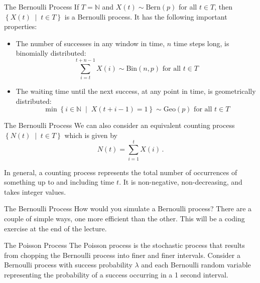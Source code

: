 \documentclass[10pt]{beamer}
\begin{document}
\begin{frame}[fragile]{The Bernoulli Process}
If \(T = \mathbb{N}\) and \(X\left(t\right) \sim \textrm{Bern}\left(p\right)\) for all \(t \in T\), then \(\left\{X\left(t\right) \;\middle|\; t \in T\right\}\) is a Bernoulli process. It has the following important properties:
\begin{itemize}[<+->]
    \item The number of successes in any window in time, \(n\) time steps long, is binomially distributed:
    \begin{equation*}
        \sum_{i = t}^{t + n - 1} X\left(i\right) \sim \textrm{Bin}\left(n, p\right) \textrm{ for all } t \in T
    \end{equation*}
    \item The waiting time until the next success, at any point in time, is geometrically distributed:
    \begin{equation*}
        \min\left\{i \in \mathbb{N} \;\middle|\; X\left(t + i - 1\right) = 1\right\} \sim \textrm{Geo}\left(p\right) \textrm{ for all } t \in T
    \end{equation*}
\end{itemize}
\end{frame}

\begin{frame}[fragile]{The Bernoulli Process}
We can also consider an equivalent counting process \(\left\{N\left(t\right) \;\middle|\; t \in T\right\}\) which is given by
\begin{equation*}
    N\left(t\right) = \sum_{i = 1}^t X\left(i\right)\,.
\end{equation*}

In general, a counting process represents the total number of occurrences of something up to and including time \(t\). It is non-negative, non-decreasing, and takes integer values.
\end{frame}

\begin{frame}[fragile]{The Bernoulli Process}
How would you simulate a Bernoulli process? There are a couple of simple ways, one more efficient than the other. This will be a coding exercise at the end of the lecture.
\end{frame}

\begin{frame}[fragile]{The Poisson Process}
The Poisson process is the stochastic process that results from chopping the Bernoulli process into finer and finer intervals. Consider a Bernoulli process with success probability \(\lambda\) and each Bernoulli random variable representing the probability of a success occurring in a 1 second interval.
\end{frame}
\end{document}
